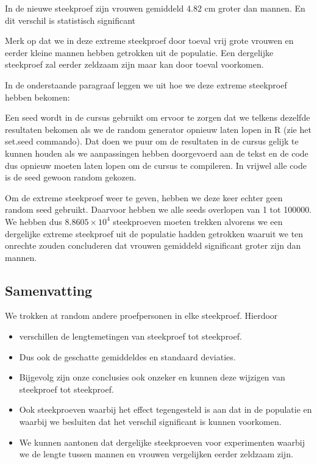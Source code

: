\documentclass[
  dutch,
  letterpaper,
  12pt]{book}
\theoremstyle{definition}
\theoremstyle{definition}
\theoremstyle{definition}
\theoremstyle{remark}
\begin{document}
In de nieuwe steekproef zijn vrouwen gemiddeld 4.82 cm groter dan
mannen. En dit verschil is statistisch significant

Merk op dat we in deze extreme steekproef door toeval vrij grote vrouwen
en eerder kleine mannen hebben getrokken uit de populatie. Een
dergelijke steekproef zal eerder zeldzaam zijn maar kan door toeval
voorkomen.

In de onderstaande paragraaf leggen we uit hoe we deze extreme
steekproef hebben bekomen:

Een seed wordt in de cursus gebruikt om ervoor te zorgen dat we telkens
dezelfde resultaten bekomen als we de random generator opnieuw laten
lopen in R (zie het set.seed commando). Dat doen we puur om de
resultaten in de cursus gelijk te kunnen houden als we aanpassingen
hebben doorgevoerd aan de tekst en de code dus opnieuw moeten laten
lopen om de cursus te compileren. In vrijwel alle code is de seed gewoon
random gekozen.

Om de extreme steekproef weer te geven, hebben we deze keer echter geen
random seed gebruikt. Daarvoor hebben we alle seeds overlopen van 1 tot
100000. We hebben dus \ensuremath{8.8605\times 10^{4}} steekproeven
moeten trekken alvorens we een dergelijke extreme steekproef uit de
populatie hadden getrokken waaruit we ten onrechte zouden concluderen
dat vrouwen gemiddeld significant groter zijn dan mannen.

\subsection{Samenvatting}\label{samenvatting}

We trokken at random andere proefpersonen in elke steekproef. Hierdoor

\begin{itemize}
\item
  verschillen de lengtemetingen van steekproef tot steekproef.
\item
  Dus ook de geschatte gemiddeldes en standaard deviaties.
\item
  Bijgevolg zijn onze conclusies ook onzeker en kunnen deze wijzigen van
  steekproef tot steekproef.
\item
  Ook steekproeven waarbij het effect tegengesteld is aan dat in de
  populatie en waarbij we besluiten dat het verschil significant is
  kunnen voorkomen.
\item
  We kunnen aantonen dat dergelijke steekproeven voor experimenten
  waarbij we de lengte tussen mannen en vrouwen vergelijken eerder
  zeldzaam zijn.
\end{itemize}
\end{document}
